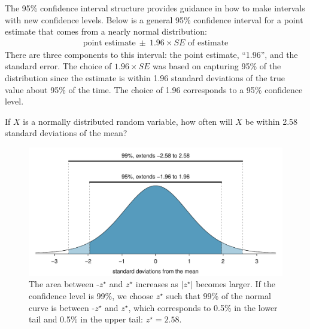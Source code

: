 The 95\% confidence interval structure provides guidance in how to make intervals with new confidence levels. Below is a general 95\% confidence interval for a point estimate that comes from a nearly normal distribution:
\begin{eqnarray}
\text{point estimate}\ \pm\ 1.96\times SE \text{ of estimate}
\end{eqnarray}
There are three components to this interval: the point estimate, ``1.96'', and the standard error. The choice of $1.96\times SE$ was based on capturing 95\% of the distribution since the estimate is within 1.96 standard deviations of the true value about 95\% of the time. The choice of 1.96 corresponds to a 95\% confidence level. 

\begin{exercisewrap}
\begin{nexercise} \label{leadInForMakingA99PercentCIExercise}
If $X$ is a normally distributed random variable, how often will $X$ be within 2.58 standard deviations of the mean?\footnotemark
\end{nexercise}
\end{exercisewrap}


\begin{figure}[ht]
\centering
\includegraphics[width=\textwidth]{ch_foundations_for_inf/figures/choosingZForCI/choosingZForCI}
\caption{The area between -$z^{\star}$ and $z^{\star}$ increases as $|z^{\star}|$ becomes larger. If the confidence level is 99\%, we choose $z^{\star}$ such that 99\% of the normal curve is between -$z^{\star}$ and $z^{\star}$, which corresponds to 0.5\% in the lower tail and 0.5\% in the upper tail: $z^{\star}=2.58$.}
\label{choosingZForCI}
\end{figure}


